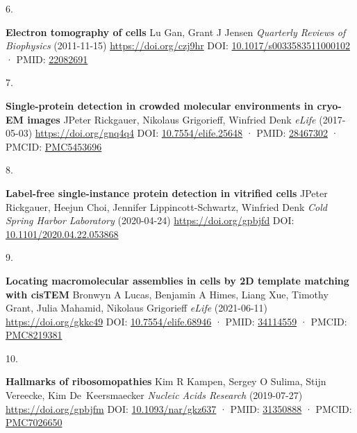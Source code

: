 \documentclass[
]{article}
\newlength{\cslhangindent}
\newlength{\csllabelwidth}
\newlength{\cslentryspacingunit} %
\newenvironment{CSLReferences}[2] %
 {%
  \setlength{\parindent}{0pt}
  \ifodd #1
  \let\oldpar\par
  \def\par{\hangindent=\cslhangindent\oldpar}
  \fi
  \setlength{\parskip}{#2\cslentryspacingunit}
 }%
 {}
\newcommand{\CSLBlock}[1]{#1\hfill\break}
\newcommand{\CSLLeftMargin}[1]{\parbox[t]{\csllabelwidth}{#1}}
\newcommand{\CSLRightInline}[1]{\parbox[t]{\linewidth - \csllabelwidth}{#1}\break}
\begin{document}
\begin{CSLReferences}{0}{0}
\leavevmode{}%
\CSLLeftMargin{6. }
\CSLRightInline{\textbf{Electron tomography of cells}
\CSLBlock{Lu Gan, Grant J Jensen} \emph{Quarterly Reviews of Biophysics} (2011-11-15) \url{https://doi.org/czj9hr}
\CSLBlock{DOI: \href{https://doi.org/10.1017/s0033583511000102}{10.1017/s0033583511000102} · PMID: \href{https://www.ncbi.nlm.nih.gov/pubmed/22082691}{22082691}}}

\leavevmode{}%
\CSLLeftMargin{7. }
\CSLRightInline{\textbf{Single-protein detection in crowded molecular environments in cryo-EM images}
\CSLBlock{JPeter Rickgauer, Nikolaus Grigorieff, Winfried Denk} \emph{eLife} (2017-05-03) \url{https://doi.org/gnq4q4}
\CSLBlock{DOI: \href{https://doi.org/10.7554/elife.25648}{10.7554/elife.25648} · PMID: \href{https://www.ncbi.nlm.nih.gov/pubmed/28467302}{28467302} · PMCID: \href{https://www.ncbi.nlm.nih.gov/pmc/articles/PMC5453696}{PMC5453696}}}

\leavevmode{}%
\CSLLeftMargin{8. }
\CSLRightInline{\textbf{Label-free single-instance protein detection in vitrified cells}
\CSLBlock{JPeter Rickgauer, Heejun Choi, Jennifer Lippincott-Schwartz, Winfried Denk} \emph{Cold Spring Harbor Laboratory} (2020-04-24) \url{https://doi.org/gpbjfd}
\CSLBlock{DOI: \href{https://doi.org/10.1101/2020.04.22.053868}{10.1101/2020.04.22.053868}}}

\leavevmode{}%
\CSLLeftMargin{9. }
\CSLRightInline{\textbf{Locating macromolecular assemblies in cells by 2D template matching with cisTEM}
\CSLBlock{Bronwyn A Lucas, Benjamin A Himes, Liang Xue, Timothy Grant, Julia Mahamid, Nikolaus Grigorieff} \emph{eLife} (2021-06-11) \url{https://doi.org/gkkc49}
\CSLBlock{DOI: \href{https://doi.org/10.7554/elife.68946}{10.7554/elife.68946} · PMID: \href{https://www.ncbi.nlm.nih.gov/pubmed/34114559}{34114559} · PMCID: \href{https://www.ncbi.nlm.nih.gov/pmc/articles/PMC8219381}{PMC8219381}}}

\leavevmode{}%
\CSLLeftMargin{10. }
\CSLRightInline{\textbf{Hallmarks of ribosomopathies}
\CSLBlock{Kim R Kampen, Sergey O Sulima, Stijn Vereecke, Kim De~Keersmaecker} \emph{Nucleic Acids Research} (2019-07-27) \url{https://doi.org/gpbjfm}
\CSLBlock{DOI: \href{https://doi.org/10.1093/nar/gkz637}{10.1093/nar/gkz637} · PMID: \href{https://www.ncbi.nlm.nih.gov/pubmed/31350888}{31350888} · PMCID: \href{https://www.ncbi.nlm.nih.gov/pmc/articles/PMC7026650}{PMC7026650}}}


\end{CSLReferences}
\end{document}
